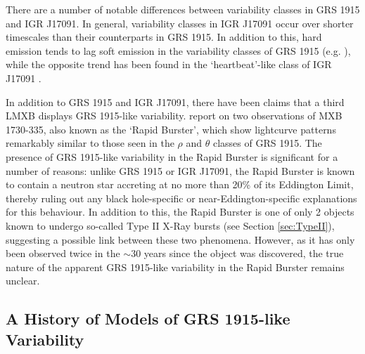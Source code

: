\par There are a number of notable differences between variability classes in GRS 1915 and IGR J17091.  In general, variability classes in IGR J17091 occur over shorter timescales than their counterparts in GRS 1915.  In addition to this, hard emission tends to lag soft emission in the variability classes of GRS 1915 (e.g. \citealp{Janiuk_Lag}), while the opposite trend has been found in the `heartbeat'-like class of IGR J17091 \citep{Altamirano_IGR_FH}.
\par In addition to GRS 1915 and IGR J17091, there have been claims that a third LMXB displays GRS 1915-like variability.  \citet{Bagnoli_RB} report on two observations of MXB 1730-335, also known as the `Rapid Burster', which show lightcurve patterns remarkably similar to those seen in the $\rho$ and $\theta$ classes of GRS 1915.  The presence of GRS 1915-like variability in the Rapid Burster is significant for a number of reasons: unlike GRS 1915 or IGR J17091, the Rapid Burster is known to contain a neutron star accreting at no more than 20\% of its Eddington Limit, thereby ruling out any black hole-specific or near-Eddington-specific explanations for this behaviour.  In addition to this, the Rapid Burster is one of only 2 objects known to undergo so-called Type II X-Ray bursts (see Section \ref{sec:TypeII}), suggesting a possible link between these two phenomena.  However, as it has only been observed twice in the $\sim30$ years since the object was discovered, the true nature of the apparent GRS 1915-like variability in the Rapid Burster remains unclear.

\subsection{A History of Models of GRS 1915-like Variability}

